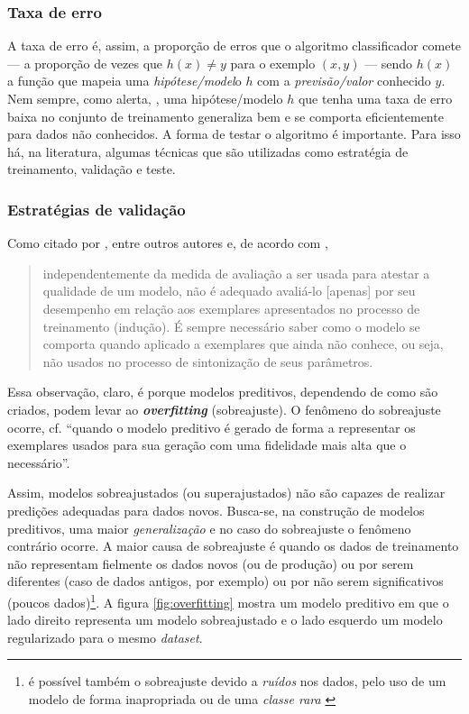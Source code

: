 \subsubsection{Taxa de erro}\label{taxa_erro}

A taxa de erro é, assim, a proporção de erros que o algoritmo classificador comete --- a proporção de vezes que $h(x)\neq y$ para o exemplo $(x,y)$ --- sendo $h(x)$ a função que mapeia uma \textit{hipótese/model}o $h$ com a \textit{previsão/valor} conhecido $y$. Nem sempre, como alerta, \cite{Norvig2013}, uma hipótese/modelo $h$ que tenha uma taxa de erro baixa no conjunto de treinamento generaliza bem e se comporta eficientemente para dados não conhecidos. A forma de testar o algoritmo é importante. Para isso há, na literatura, algumas técnicas que são utilizadas como estratégia de treinamento, validação e teste.

\subsubsection{Estratégias de validação}\label{estrategias_validacao}

Como citado por \cite{Norvig2013}, \cite{luger_inteligencia_2015} entre outros autores e, de acordo com \cite[p. 125]{Boscarioli2017}, \begin{quote}
	independentemente da medida de avaliação a ser usada para atestar a qualidade de um modelo, não é adequado avaliá-lo [apenas] por seu desempenho em relação aos exemplares apresentados no processo de treinamento (indução). É sempre necessário saber como o modelo se comporta quando aplicado a exemplares que ainda não conhece, ou seja, não usados no processo de sintonização de seus parâmetros.
\end{quote}

Essa observação, claro, é porque modelos preditivos, dependendo de como são criados, podem levar ao \textit{\textbf{overfitting}} (sobreajuste). O fenômeno do sobreajuste ocorre, cf. \cite{Boscarioli2017} ``quando o modelo preditivo é gerado de forma a representar os exemplares usados para sua geração com uma fidelidade mais alta que o necessário''. 

Assim, modelos sobreajustados (ou superajustados) não são capazes de realizar predições adequadas para dados novos. Busca-se, na construção de modelos preditivos, uma maior \textit{generalização} e no caso do sobreajuste o fenômeno contrário ocorre. A maior causa de sobreajuste é quando os dados de treinamento não representam fielmente os dados novos (ou de produção) ou por serem diferentes (caso de dados antigos, por exemplo) ou por não serem significativos (poucos dados)\footnote{ é possível também o sobreajuste devido a \textit{ruídos} nos dados, pelo uso de um modelo de forma inapropriada ou de uma \textit{classe rara} \cite[p.35]{aprenda_mineracao_fernando_amaral16}}. A figura \ref{fig:overfitting} mostra um modelo preditivo em que o lado direito representa um modelo sobreajustado e o lado esquerdo um modelo regularizado para o mesmo \textit{dataset}.

